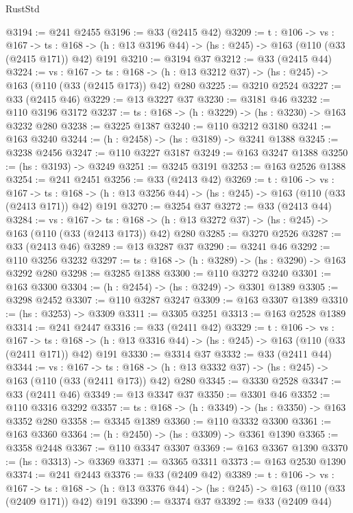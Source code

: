 \begin{lexlean}{RustStd}
\begin{coremodule}
@3194 := @241 @2455
@3196 := @33 (@2415 @42)
@3209 := {t : @106} ->
  {vs : @167} ->
  {ts : @168} -> (h : @13 @3196 @44) -> (hs : @245) -> @163 (@110 (@33 (@2415 @171)) @42) @191
@3210 := @3194 @37
@3212 := @33 (@2415 @44)
@3224 := {vs : @167} ->
  {ts : @168} -> (h : @13 @3212 @37) -> (hs : @245) -> @163 (@110 (@33 (@2415 @173)) @42) @280
@3225 := @3210 @2524
@3227 := @33 (@2415 @46)
@3229 := @13 @3227 @37
@3230 := @3181 @46
@3232 := @110 @3196 @3172
@3237 := {ts : @168} -> (h : @3229) -> (hs : @3230) -> @163 @3232 @280
@3238 := @3225 @1387
@3240 := @110 @3212 @3180
@3241 := @163 @3240
@3244 := (h : @2458) -> (hs : @3189) -> @3241 @1388
@3245 := @3238 @2456
@3247 := @110 @3227 @3187
@3249 := @163 @3247 @1388
@3250 := (hs : @3193) -> @3249
@3251 := @3245 @3191
@3253 := @163 @2526 @1388
@3254 := @241 @2451
@3256 := @33 (@2413 @42)
@3269 := {t : @106} ->
  {vs : @167} ->
  {ts : @168} -> (h : @13 @3256 @44) -> (hs : @245) -> @163 (@110 (@33 (@2413 @171)) @42) @191
@3270 := @3254 @37
@3272 := @33 (@2413 @44)
@3284 := {vs : @167} ->
  {ts : @168} -> (h : @13 @3272 @37) -> (hs : @245) -> @163 (@110 (@33 (@2413 @173)) @42) @280
@3285 := @3270 @2526
@3287 := @33 (@2413 @46)
@3289 := @13 @3287 @37
@3290 := @3241 @46
@3292 := @110 @3256 @3232
@3297 := {ts : @168} -> (h : @3289) -> (hs : @3290) -> @163 @3292 @280
@3298 := @3285 @1388
@3300 := @110 @3272 @3240
@3301 := @163 @3300
@3304 := (h : @2454) -> (hs : @3249) -> @3301 @1389
@3305 := @3298 @2452
@3307 := @110 @3287 @3247
@3309 := @163 @3307 @1389
@3310 := (hs : @3253) -> @3309
@3311 := @3305 @3251
@3313 := @163 @2528 @1389
@3314 := @241 @2447
@3316 := @33 (@2411 @42)
@3329 := {t : @106} ->
  {vs : @167} ->
  {ts : @168} -> (h : @13 @3316 @44) -> (hs : @245) -> @163 (@110 (@33 (@2411 @171)) @42) @191
@3330 := @3314 @37
@3332 := @33 (@2411 @44)
@3344 := {vs : @167} ->
  {ts : @168} -> (h : @13 @3332 @37) -> (hs : @245) -> @163 (@110 (@33 (@2411 @173)) @42) @280
@3345 := @3330 @2528
@3347 := @33 (@2411 @46)
@3349 := @13 @3347 @37
@3350 := @3301 @46
@3352 := @110 @3316 @3292
@3357 := {ts : @168} -> (h : @3349) -> (hs : @3350) -> @163 @3352 @280
@3358 := @3345 @1389
@3360 := @110 @3332 @3300
@3361 := @163 @3360
@3364 := (h : @2450) -> (hs : @3309) -> @3361 @1390
@3365 := @3358 @2448
@3367 := @110 @3347 @3307
@3369 := @163 @3367 @1390
@3370 := (hs : @3313) -> @3369
@3371 := @3365 @3311
@3373 := @163 @2530 @1390
@3374 := @241 @2443
@3376 := @33 (@2409 @42)
@3389 := {t : @106} ->
  {vs : @167} ->
  {ts : @168} -> (h : @13 @3376 @44) -> (hs : @245) -> @163 (@110 (@33 (@2409 @171)) @42) @191
@3390 := @3374 @37
@3392 := @33 (@2409 @44)

\end{coremodule}
\end{lexlean}
